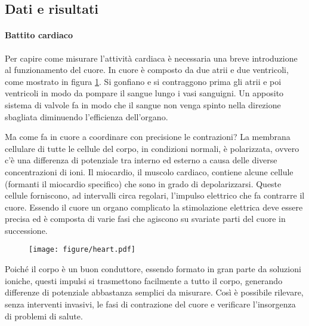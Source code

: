 \subsection{Dati e risultati}

\paragraph{Battito cardiaco}

Per capire come misurare l'attività cardiaca è necessaria una breve introduzione
al funzionamento del cuore. In cuore è composto da due atrii e due ventricoli,
come mostrato in figura \ref{fig:heart7}. Si gonfiano e si contraggono prima gli atrii e poi ventricoli
in modo da pompare il sangue lungo i vasi sanguigni. Un apposito sistema di valvole
fa in modo che il sangue non venga spinto nella direzione sbagliata diminuendo l'efficienza
dell'organo.

Ma come fa in cuore a coordinare con precisione le contrazioni? La membrana cellulare di tutte
le cellule del corpo, in condizioni normali, è polarizzata, ovvero c'è una differenza di potenziale
tra interno ed esterno a causa delle diverse concentrazioni di ioni. Il miocardio, il muscolo cardiaco,
contiene alcune cellule (formanti il miocardio specifico) che sono in grado di depolarizzarsi. Queste cellule
forniscono, ad intervalli circa regolari, l'impulso elettrico che fa contrarre il cuore.
Essendo il cuore un organo complicato la stimolazione elettrica deve essere precisa ed è composta
di varie fasi che agiscono su svariate parti del cuore in successione.

\begin{figure}
    \centering
	\texttt{[image: figure/heart.pdf]}
	\caption{}
	\label{fig:heart7}
\end{figure}

Poiché il corpo è un buon conduttore, essendo formato in gran parte da soluzioni ioniche, questi impulsi
si trasmettono facilmente a tutto il corpo, generando differenze di potenziale abbastanza semplici
da misurare. Così è possibile rilevare, senza interventi invasivi, le fasi di contrazione
del cuore e verificare l'insorgenza di problemi di salute.

